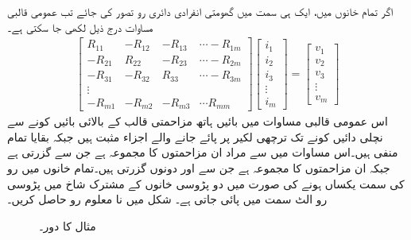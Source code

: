 اگر تمام خانوں میں، ایک ہی سمت میں گھومتی انفرادی دائری رو  تصور کی جائے تب عمومی قالبی مساوات درج ذیل لکھی جا سکتی ہے۔
\begin{align}\label{مساوات_جوڑ_عمومی_مساوات_متعدد_منبع}
\begin{bmatrix}
R_{11} & -R_{12}& -R_{13}& \cdots -R_{1m}\\
-R_{21} & R_{22}& -R_{23}& \cdots -R_{2m}\\
-R_{31} & -R_{32}& R_{33}& \cdots -R_{3m}\\
\vdots\\
-R_{m1}&-R_{m2}&-R_{m3}&\cdots R_{mm}
\end{bmatrix}
\begin{bmatrix}
i_1\\
i_2\\
i_3\\
\vdots\\
i_m
\end{bmatrix}
=
\begin{bmatrix}
v_{1}\\
v_{2}\\
v_{3}\\
\vdots\\
v_{m}
\end{bmatrix}
\end{align}
اس عمومی قالبی مساوات میں بائیں ہاتھ مزاحمتی قالب کے بالائی بائیں کونے سے نچلی دائیں کونے  تک ترچھی لکیر پر پائے جانے والے اجزاء مثبت ہیں جبکہ بقایا تمام منفی ہیں۔اس مساوات میں  سے مراد ان مزاحمتوں کا مجموعہ ہے جن سے  گزرتی ہے جبکہ  ان مزاحمتوں کا مجموعہ ہے جن سے  اور  دونوں گزرتی ہیں۔تمام خانوں میں رو کی سمت یکساں ہونے کی صورت میں دو پڑوسی خانوں کے مشترک شاخ میں پڑوسی رو الٹ سمت میں پائی جاتی ہے۔
شکل  میں نا معلوم رو حاصل کریں۔
\begin{figure}
\centering
{}
\caption{مثال  کا دور۔}
\label{شکل_جوڑ_تین_دائری_رو_مثال_الف}
\end{figure}%

